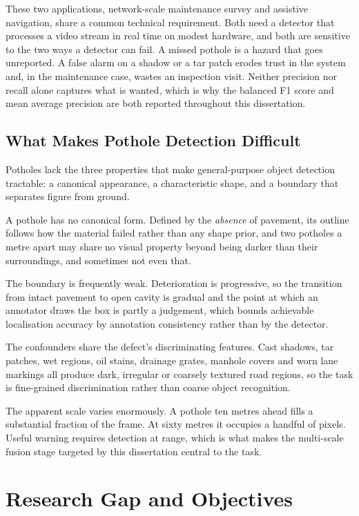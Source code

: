 \documentclass[MScCS]{uccthesis}
\begin{document}
These two applications, network-scale maintenance survey and assistive
navigation, share a common technical requirement. Both need a detector that
processes a video stream in real time on modest hardware, and both are
sensitive to the two ways a detector can fail. A missed pothole is a hazard
that goes unreported. A false alarm on a shadow or a tar patch erodes trust in
the system and, in the maintenance case, wastes an inspection visit. Neither
precision nor recall alone captures what is wanted, which is why the balanced
F1 score and mean average precision are both reported throughout this
dissertation.

\subsection{What Makes Pothole Detection Difficult}
\label{sec:what_makes_hard}

Potholes lack the three properties that make general-purpose object detection
tractable: a canonical appearance, a characteristic shape, and a boundary that
separates figure from ground.

A pothole has no canonical form. Defined by the \emph{absence} of pavement, its
outline follows how the material failed rather than any shape prior, and two
potholes a metre apart may share no visual property beyond being darker than
their surroundings, and sometimes not even that.

The boundary is frequently weak. Deterioration is progressive, so the
transition from intact pavement to open cavity is gradual and the point at
which an annotator draws the box is partly a judgement, which bounds achievable
localisation accuracy by annotation consistency rather than by the detector.

The confounders share the defect's discriminating features. Cast shadows, tar
patches, wet regions, oil stains, drainage grates, manhole covers and worn lane
markings all produce dark, irregular or coarsely textured road regions, so the
task is fine-grained discrimination rather than coarse object recognition.

The apparent scale varies enormously. A pothole ten metres ahead fills a
substantial fraction of the frame. At sixty metres it occupies a handful of
pixels. Useful warning requires detection at range, which is what makes the
multi-scale fusion stage targeted by this dissertation central to the task.



\section{Research Gap and Objectives}
\label{sec:gap_objectives}
\end{document}
